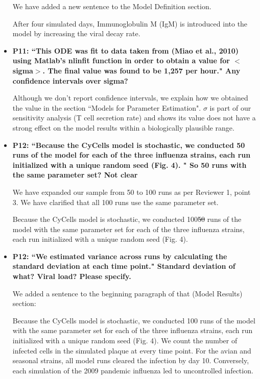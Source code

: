 \documentclass[10pt]{article}
\newcommand{\removed}[1]{{\color{dkred}\sout{#1}}}
\newcommand{\new}[1]{{\color{dkgreen}#1}}
\newenvironment{response}{\fontfamily{cms}\selectfont\small}{\par}
\begin{document}
\begin{itemize}
\begin{response}
We have added a new sentence to the Model Definition section.

\begin{displayquote}
\new{After four simulated days, Immunoglobulin M (IgM) is introduced into the model by increasing the viral decay rate.}
\end{displayquote}
\end{response}

\item \textbf{P11: ``This ODE was fit to data taken from (Miao et al., 2010) using Matlab's nlinfit function in order to obtain a value for $<$sigma$>$. The final value was found to be 1,257 per hour." Any confidence intervals over sigma?}

\begin{response}
Although we don't report confidence intervals, we explain how we obtained the value in the section ``Models for Parameter Estimation".  $\sigma$ is part of our sensitivity analysis (T cell secretion rate) and shows its value does not have a strong effect on the model results within a biologically plausible range.
\end{response}

\item \textbf{P12: ``Because the CyCells model is stochastic, we conducted 50 runs of the model for each of the three influenza strains, each run initialized with a unique random seed (Fig. 4). " So 50 runs with the same parameter set? Not clear}

\begin{response}
We have expanded our sample from 50 to 100 runs as per Reviewer 1, point 3.  We have clarified that all 100 runs use the same parameter set.
\begin{displayquote}
Because the CyCells model is stochastic, we conducted \new{100}\removed{50} runs of the model \new{with the same parameter set} for each of the three influenza strains, each run initialized with a unique random seed (Fig. 4).  
\end{displayquote}
\end{response}

\item \textbf{P12: ``We estimated variance across runs by calculating the standard deviation at each time point." Standard deviation of what? Viral load? Please specify.}

\begin{response}
We added a sentence to the beginning paragraph of that (Model Results) section:
\begin{displayquote}
Because the CyCells model is stochastic, we conducted 100 runs of the model with the same parameter set for each of the three influenza strains, each run initialized with a unique random seed (Fig. 4).  \new{We count the number of infected cells in the simulated plaque at every time point.}  For the avian and seasonal strains, all model runs cleared the infection by day 10.  Conversely, each simulation of the 2009 pandemic influenza led to uncontrolled infection. \\


\end{displayquote}
\end{response}
\end{itemize}
\end{document}
